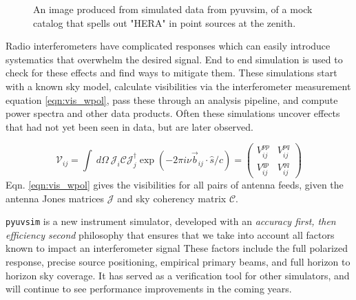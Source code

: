 \documentclass[a0,landscape]{a0poster}
\begin{document}
\begin{multicols}{4}
\begin{figure}[H]
\centering
\vspace*{-20pt}
\caption{An image produced from simulated data from pyuvsim, of a mock catalog that spells out "HERA" in point sources at the zenith.}
\vspace*{-15pt}
\end{figure}

Radio interferometers have complicated responses which can easily introduce systematics that overwhelm the desired signal. End to end simulation is used to check for these effects and find ways to mitigate them. These simulations start with a known sky model, calculate visibilities via the interferometer measurement equation \eqref{eqn:vis_wpol}, pass these through an analysis pipeline, and compute power spectra and other data products. Often these simulations uncover effects that had not yet been seen in data, but are later observed.

\begin{equation}
\mathcal{V}_{ij} = \int\: d\Omega\: \mathcal{J}_i \mathcal{C} \mathcal{J}_j^\dag \exp( - 2\pi i \nu \vec{b}_{ij} \cdot \hat{s} / c)
= \left( \begin{matrix}
V^{pp}_{ij} & V^{pq}_{ij} \\
V^{qp}_{ij} & V^{qq}_{ij}
\end{matrix} \right)
\label{eqn:vis_wpol}
\end{equation}
Eqn. \eqref{eqn:vis_wpol} gives the visibilities for all pairs of antenna feeds, given the antenna Jones matrices $\mathcal{J}$ and sky coherency matrix $\mathcal{C}$.

\texttt{pyuvsim} is a new instrument simulator, developed with an \emph{accuracy first, then efficiency second} philosophy that ensures that we take into account all factors known to impact an interferometer signal  These factors include the full polarized response, precise source positioning, empirical primary beams, and full horizon to horizon sky coverage. It has served as a verification tool for other simulators, and will continue to see performance improvements in the coming years.









\end{multicols}
\end{document}
